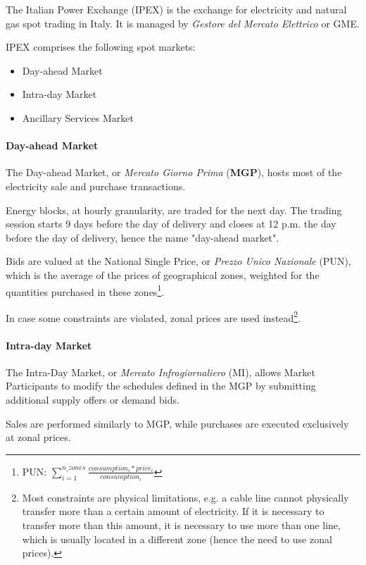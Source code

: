 The Italian Power Exchange (IPEX) is the exchange for electricity and natural gas spot trading in Italy.
It is managed by \textit{Gestore del Mercato Elettrico} or GME.\cite{bib:gme:mpe}

IPEX comprises the following spot markets:
    \begin{itemize}
        \item Day-ahead Market
        \item Intra-day Market
        \item Ancillary Services Market
    \end{itemize}
    
\paragraph{Day-ahead Market}
    The Day-ahead Market, or \textit{Mercato Giorno Prima} (\textbf{MGP}), hosts most of the electricity sale and purchase transactions.
    
    Energy blocks, at hourly granularity, are traded for the next day.
    The trading session starts 9 days before the day of delivery and closes at 12 p.m. the day before the day of delivery, hence the name "day-ahead market".
    
    Bids are valued at the National Single Price, or \textit{Prezzo Unico Nazionale} (PUN), which is the average of the prices of geographical zones, weighted for the quantities purchased in these zones\footnote{PUN: $\sum_{i=1}^{n\_zones} \frac{consumption_i * price_i}{consumption_i}$}.
    
    In case some constraints are violated, zonal prices are used instead\footnote{Most constraints are physical limitations, e.g. a cable line cannot physically transfer more than a certain amount of electricity. If it is necessary to transfer more than this amount, it is necessary to use more than one line, which is usually located in a different zone (hence the need to use zonal prices).}.

\paragraph{Intra-day Market}
    The Intra-Day Market, or \textit{Mercato Infragiornaliero} (MI), allows Market Participants to modify the schedules defined in the MGP by submitting additional supply offers or demand bids.
    
    Sales are performed similarly to MGP, while purchases are executed exclusively at zonal prices.
    
